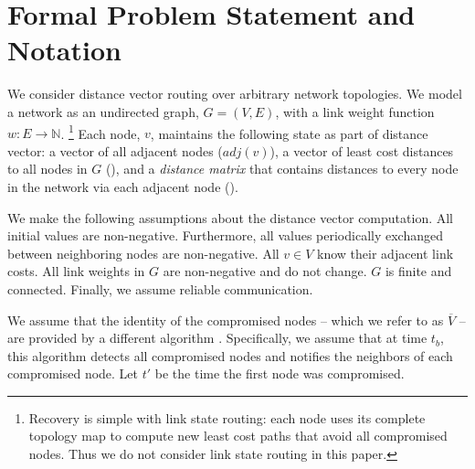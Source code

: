 \section{Formal Problem Statement and Notation}
\label{sec:problem}

We consider distance vector routing \cite{Gall87,Ford62} over arbitrary network topologies. We model a network as an undirected graph, $G=(V,E)$,
with a link weight function $w: E \rightarrow \mathbb{N}$.
{\footnote {\small Recovery is simple with link state routing: each node uses its complete topology map to compute new least cost paths that avoid all compromised nodes.
Thus we do not consider link state routing in this paper.}}
Each node, $v$, maintains the following state as part of distance vector: a vector of all adjacent nodes ($adj(v)$), a vector of least cost distances to all
nodes in $G$ (\minvvs), and a \emph{distance matrix} that contains distances to every node in the network via each adjacent node (\dmatrixvs). 

We make the following assumptions about the distance vector computation. All initial \dmatrix values are non-negative. Furthermore, all \minv values periodically
exchanged between neighboring nodes are non-negative. All $v \in V$ know their adjacent link costs. All link weights in $G$ are non-negative and do not change.
$G$ is finite and connected. Finally, we assume reliable communication. 

We assume that the identity of the compromised nodes -- which we refer to as $\overline{V}$ -- are provided by a different algorithm \cite{Arini,Feam,Vishal02,Pad03,Paul02}.
Specifically, we assume that at time $t_b$, this algorithm detects all compromised nodes and notifies the neighbors of each compromised node.  Let $t'$ be the time the first node was compromised.

